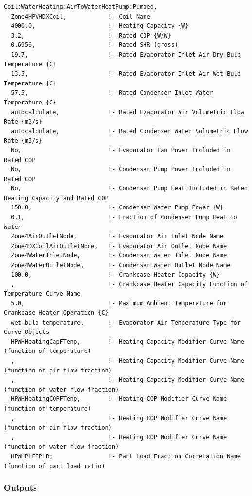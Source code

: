 \begin{lstlisting}
Coil:WaterHeating:AirToWaterHeatPump:Pumped,
  Zone4HPWHDXCoil,            !- Coil Name
  4000.0,                     !- Heating Capacity {W}
  3.2,                        !- Rated COP {W/W}
  0.6956,                     !- Rated SHR (gross)
  19.7,                       !- Rated Evaporator Inlet Air Dry-Bulb Temperature {C}
  13.5,                       !- Rated Evaporator Inlet Air Wet-Bulb Temperature {C}
  57.5,                       !- Rated Condenser Inlet Water Temperature {C}
  autocalculate,              !- Rated Evaporator Air Volumetric Flow Rate {m3/s}
  autocalculate,              !- Rated Condenser Water Volumetric Flow Rate {m3/s}
  No,                         !- Evaporator Fan Power Included in Rated COP
  No,                         !- Condenser Pump Power Included in Rated COP
  No,                         !- Condenser Pump Heat Included in Rated Heating Capacity and Rated COP
  150.0,                      !- Condenser Water Pump Power {W}
  0.1,                        !- Fraction of Condenser Pump Heat to Water
  Zone4AirOutletNode,         !- Evaporator Air Inlet Node Name
  Zone4DXCoilAirOutletNode,   !- Evaporator Air Outlet Node Name
  Zone4WaterInletNode,        !- Condenser Water Inlet Node Name
  Zone4WaterOutletNode,       !- Condenser Water Outlet Node Name
  100.0,                      !- Crankcase Heater Capacity {W}
  ,                           !- Crankcase Heater Capacity Function of Temperature Curve Name
  5.0,                        !- Maximum Ambient Temperature for Crankcase Heater Operation {C}
  wet-bulb temperature,       !- Evaporator Air Temperature Type for Curve Objects
  HPWHHeatingCapFTemp,        !- Heating Capacity Modifier Curve Name (function of temperature)
  ,                           !- Heating Capacity Modifier Curve Name (function of air flow fraction)
  ,                           !- Heating Capacity Modifier Curve Name (function of water flow fraction)
  HPWHHeatingCOPFTemp,        !- Heating COP Modifier Curve Name (function of temperature)
  ,                           !- Heating COP Modifier Curve Name (function of air flow fraction)
  ,                           !- Heating COP Modifier Curve Name (function of water flow fraction)
  HPWHPLFFPLR;                !- Part Load Fraction Correlation Name (function of part load ratio)
\end{lstlisting}

\subsubsection{Outputs}\label{outputs-23}

